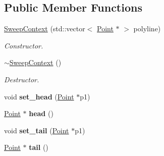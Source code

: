 \subsection*{Public Member Functions}
\begin{DoxyCompactItemize}
\item 
\hypertarget{classp2t_1_1_sweep_context_a2b500da0d77926f92fdcf41e45164ef4}{\hyperlink{classp2t_1_1_sweep_context_a2b500da0d77926f92fdcf41e45164ef4}{Sweep\+Context} (std\+::vector$<$ \hyperlink{structp2t_1_1_point}{Point} $\ast$ $>$ polyline)}\label{classp2t_1_1_sweep_context_a2b500da0d77926f92fdcf41e45164ef4}

\begin{DoxyCompactList}\small\item\em Constructor. \end{DoxyCompactList}\item 
\hypertarget{classp2t_1_1_sweep_context_a4275f1eb166fe4c69d18670898c65f98}{\hyperlink{classp2t_1_1_sweep_context_a4275f1eb166fe4c69d18670898c65f98}{$\sim$\+Sweep\+Context} ()}\label{classp2t_1_1_sweep_context_a4275f1eb166fe4c69d18670898c65f98}

\begin{DoxyCompactList}\small\item\em Destructor. \end{DoxyCompactList}\item 
\hypertarget{classp2t_1_1_sweep_context_abd31ac7cc3ba9d418e08d5583ae7d32e}{void {\bfseries set\+\_\+head} (\hyperlink{structp2t_1_1_point}{Point} $\ast$p1)}\label{classp2t_1_1_sweep_context_abd31ac7cc3ba9d418e08d5583ae7d32e}

\item 
\hypertarget{classp2t_1_1_sweep_context_a18a228af449cec5e739b4303be83ddf1}{\hyperlink{structp2t_1_1_point}{Point} $\ast$ {\bfseries head} ()}\label{classp2t_1_1_sweep_context_a18a228af449cec5e739b4303be83ddf1}

\item 
\hypertarget{classp2t_1_1_sweep_context_ac685ab377d5f1b184b4bb94e151a2af9}{void {\bfseries set\+\_\+tail} (\hyperlink{structp2t_1_1_point}{Point} $\ast$p1)}\label{classp2t_1_1_sweep_context_ac685ab377d5f1b184b4bb94e151a2af9}

\item 
\hypertarget{classp2t_1_1_sweep_context_a160d5f2ff0f93af7a577a36949a04623}{\hyperlink{structp2t_1_1_point}{Point} $\ast$ {\bfseries tail} ()}\label{classp2t_1_1_sweep_context_a160d5f2ff0f93af7a577a36949a04623}


\end{DoxyCompactItemize}
